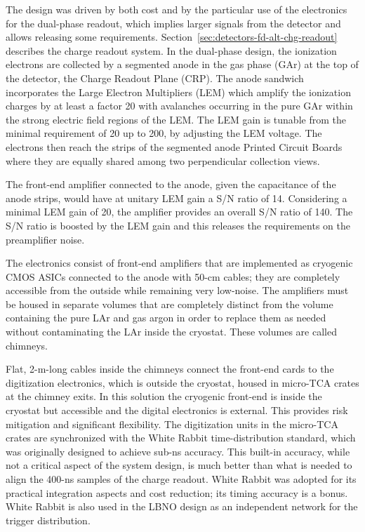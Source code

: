 The design was driven by both cost and by the particular use of the
electronics for the dual-phase readout, which implies larger signals
from the detector  and allows releasing some
requirements. Section~\ref{sec:detectors-fd-alt-chg-readout} describes
the charge readout system.  In the dual-phase design, the ionization
electrons are collected by a segmented anode in the gas phase (GAr) at
the top of the detector, the Charge Readout Plane (CRP). The anode
sandwich incorporates the Large Electron Multipliers (LEM) which
amplify the ionization charges by at least a factor 20 with avalanches
occurring in the pure GAr within the strong electric field regions of
the LEM.  The LEM gain is tunable from the minimal requirement of 20
up to 200, by adjusting the LEM voltage. The electrons then reach the
strips of the segmented anode Printed Circuit Boards where they are
equally shared among two perpendicular collection views.

The front-end amplifier connected to the anode, given the capacitance
of the anode strips, would have at unitary LEM gain a S/N ratio of
14. Considering a minimal LEM gain of 20, the amplifier provides an
overall S/N ratio of 140. The S/N ratio is boosted by the LEM gain and
this releases the requirements on the preamplifier noise.

The electronics consist of front-end amplifiers that are implemented as cryogenic CMOS ASICs
connected to the anode with 50-cm cables; they are completely
accessible from the outside while remaining very low-noise. The
amplifiers must be housed in separate volumes that
are completely distinct from the volume containing the pure LAr and
gas argon in order to replace them as needed without
contaminating the LAr inside the cryostat. These volumes are called chimneys.

Flat, 2-m-long cables inside the chimneys connect the front-end cards
to the digitization electronics, which is outside the cryostat, housed
in micro-TCA crates at the chimney exits.  In this solution the
cryogenic front-end is inside the cryostat but accessible and the
digital electronics is external.  This provides risk mitigation and
significant flexibility. The digitization units in the micro-TCA
crates are synchronized with the White Rabbit time-distribution
standard\cite{WR-standard}, which was originally designed to achieve
sub-ns accuracy.
%
This built-in accuracy, while not a critical aspect of the system
design, is much better than what is needed to align the 400-ns samples
of the charge readout.  White Rabbit was adopted for its practical
integration aspects and cost reduction; its timing accuracy is a
bonus.   White Rabbit is also used in the LBNO design as an independent
network for the trigger distribution. 

